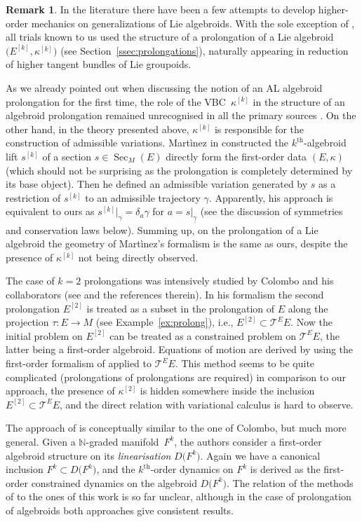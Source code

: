 \documentclass[10pt,a4paper]{amsart}
\newcommand{\grB}{{$\N$-graded manifold}}
\newcommand{\ZM}{{VBC}} %
\newcommand{\thh}[1]{#1^{\mathrm{th}}} %
\newcommand{\N}{\mathbb{N}}
\newcommand{\und}{\underline}
\newcommand{\Sec}{\operatorname{Sec}}
\newcommand{\ra}{\rightarrow}
\newcommand{\E}[1]{E^{[#1]}} %
\numberwithin{equation}{section}
\theoremstyle{definition}
\newtheorem{rem}[thm]{Remark}
\begin{document}
\begin{rem}\label{rem:var_calc}In the literature there have been a few attempts to develop higher-order mechanics on generalizations of Lie algebroids. With the sole exception of \cite{BGG_2015}, all trials known to us used the structure of a prolongation of a Lie algebroid $\big(\E{k},\kappa^{[k]}\big)$ (see Section~\ref{ssec:prolongations}), naturally appearing in reduction of higher tangent bundles of Lie groupoids.

As we already pointed out when discussing the notion of an AL algebroid prolongation for the first time, the role of the \ZM\ $\kappa^{[k]}$ in the structure of an algebroid prolongation remained unrecognised in all the primary sources \cite{Col_deDiego_seminar_2011, Martinez_2015, Saunders_2004}. On the other hand, in the theory presented above, $\kappa^{[k]}$ is responsible for the construction of admissible variations. Mart\`{i}nez in \cite{Martinez_2015} constructed the $\thh{k}$-algebroid lift $s^{[k]}$ of a section $s\in\Sec_M(E)$ directly form the first-order data $(E,\kappa)$ (which should not be surprising as the prolongation is completely determined by its base object). Then he defined an admissible variation generated by $s$ as a restriction of $s^{[k]}$ to an admissible trajectory $\gamma$. Apparently, his approach is equivalent to ours as $s^{[k]}|_\gamma=\delta_a\gamma$ for $a=s|_{\und{\gamma}}$ (see the discussion of symmetries and conservation laws below). Summing up, on the prolongation of a Lie algebroid the geometry of Mart\`{i}nez's formalism is the same as ours, despite the presence of $\kappa^{[k]}$ not being directly observed.

The case of $k=2$ prolongations was intensively studied by Colombo and his collaborators (see \cite{Abrunheiro_Colombo_2018, Colombo_2017} and the references therein). In his formalism the second prolongation $\E 2$ is treated as a subset in the prolongation of $E$ along the projection $\tau\colon E\ra M$ (see Example~\ref{ex:prolong}), i.e., $\E 2\subset \mathcal{T}^EE$. Now the initial problem on $\E 2$ can be treated as a constrained problem on $ \mathcal{T}^EE$, the latter being a first-order algebroid. Equations of motion are derived by using the first-order formalism of \cite{Martinez_geom_form_mech_lie_alg_2001} applied to $\mathcal{T}^EE$. This method seems to be quite complicated (prolongations of prolongations are required) in comparison to our approach, the presence of $\kappa^{[2]}$ is hidden somewhere inside the inclusion $\E 2\subset \mathcal{T}^EE$, and the direct relation with variational calculus is hard to observe.

The approach of \cite{BGG_2015} is conceptually similar to the one of Colombo, but much more general. Given a \grB\ $F^k$, the authors consider a first-order algebroid structure on its \emph{linearisation} $D\big(F^k\big)$. Again we have a canonical inclusion $F^k\subset D\big(F^k\big)$, and the $\thh{k}$-order dynamics on $F^k$ is derived as the first-order constrained dynamics on the algebroid $D\big(F^k\big)$. The relation of the methods of \cite{BGG_2015} to the ones of this work is so far unclear, although in the case of prolongation of algebroids both approaches give consistent results.
\end{rem}
\end{document}
